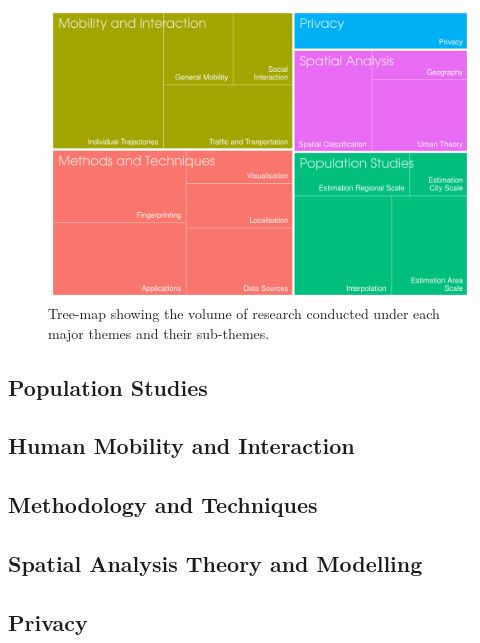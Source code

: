 \begin{figure}
  \includegraphics{images/literature-themes-treemap.png}
  \caption{Tree-map showing the volume of research conducted under each major themes and their sub-themes.}
  \label{figure:literature:themes}
\end{figure}

\subsection{Population Studies}


\subsection{Human Mobility and Interaction}

\subsection{Methodology and Techniques}

\subsection{Spatial Analysis Theory and Modelling}

\subsection{Privacy}

